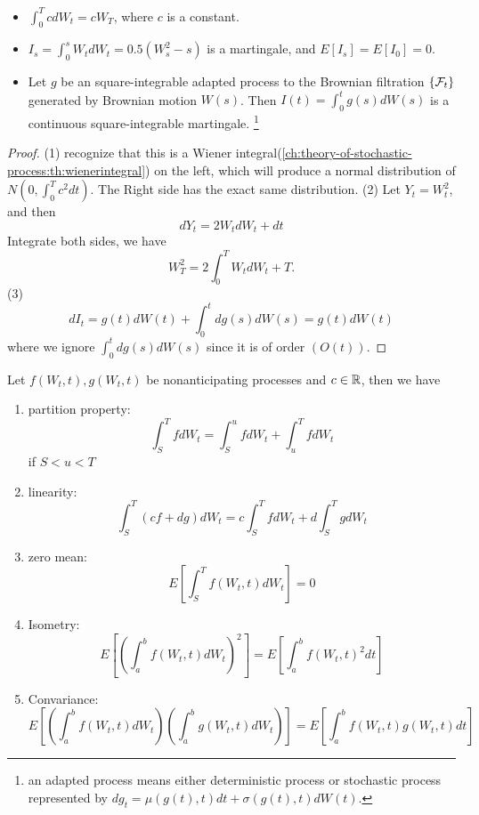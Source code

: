 \begin{refsection}
\begin{lemma}\label{ch:theory-of-stochastic-process:th:ItoIntegralBasicProperties}
	\begin{itemize}\hfill
		\item $\int_0^T cdW_t = cW_T$, where $c$ is a constant.
		\item $I_s = \int_0^s W_tdW_t = 0.5(W_s^2 - s)$ is a martingale, and $E[I_s]=E[I_0] = 0$.
		\item Let $g$ be an square-integrable adapted process to the Brownian filtration $\{\mathcal{F}_t\}$ generated by Brownian motion $W(s)$. Then $I(t) = \int_0^t g(s)dW(s)$ is a continuous square-integrable martingale. \footnote{an adapted process means either deterministic process or stochastic process represented by $dg_t = \mu(g(t),t)dt + \sigma(g(t),t)dW(t)$.}
	\end{itemize}
\end{lemma}
\begin{proof}
	(1) recognize that this is a Wiener integral(\autoref{ch:theory-of-stochastic-process:th:wienerintegral}) on the left, which will produce a normal distribution of $N(0,\int_0^T c^2dt)$. The Right side has the exact same distribution.
	(2) Let $Y_t = W_t^2$, and then 
	$$dY_t = 2W_tdW_t + dt$$
	Integrate both sides, we have $$W_T^2 = 2\int_0^T W_tdW_t + T.$$
	(3) 
	$$dI_t = g(t)dW(t) + \int_0^t dg(s) dW(s) = g(t)dW(t)$$
	where we ignore $\int_0^t dg(s) dW(s)$ since it is of order $(O(t))$.
	
\end{proof}




\begin{theorem}\cite[100]{calin2012introduction}\label{ch:theory-of-stochastic-process:th:Itointegralproperty}
	Let $f(W_t,t), g(W_t,t)$ be nonanticipating processes and $c\in \mathbb{R}$, then we have
	\begin{enumerate}
		\item partition property: $$\int_S^T fdW_t = \int_S^u fdW_t + \int_u^T fdW_t$$ if $S<u<T$
		\item linearity: $$\int_S^T (cf + dg)dW_t = c\int_S^T fdW_t +d\int_S^T gdW_t$$
		\item zero mean:
		$$E[\int_S^T f(W_t,t)dW_t ] = 0$$
		\item Isometry:
		$$E[(\int_a^b f(W_t,t)dW_t)^2] = E[\int_a^b f(W_t,t)^2dt]$$
		\item Convariance:
		$$E[(\int_a^b f(W_t,t)dW_t)(\int_a^b g(W_t,t)dW_t)] = E[\int_a^b f(W_t,t)g(W_t,t)dt]$$
		

\end{enumerate}
\end{theorem}
\end{refsection}
